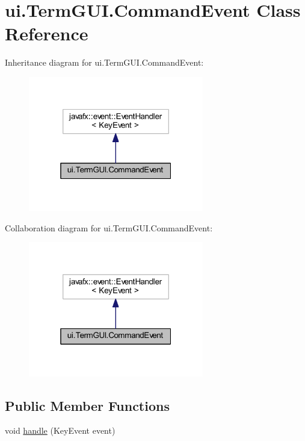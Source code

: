 \hypertarget{classui_1_1_term_g_u_i_1_1_command_event}{}\section{ui.\+Term\+G\+U\+I.\+Command\+Event Class Reference}
\label{classui_1_1_term_g_u_i_1_1_command_event}


Inheritance diagram for ui.\+Term\+G\+U\+I.\+Command\+Event\+:
\nopagebreak
\begin{figure}[H]
\begin{center}
\leavevmode
\includegraphics[width=217pt]{classui_1_1_term_g_u_i_1_1_command_event__inherit__graph}
\end{center}
\end{figure}


Collaboration diagram for ui.\+Term\+G\+U\+I.\+Command\+Event\+:
\nopagebreak
\begin{figure}[H]
\begin{center}
\leavevmode
\includegraphics[width=217pt]{classui_1_1_term_g_u_i_1_1_command_event__coll__graph}
\end{center}
\end{figure}
\subsection*{Public Member Functions}
\begin{DoxyCompactItemize}
\item 
void \mbox{\hyperlink{classui_1_1_term_g_u_i_1_1_command_event_a318fdfbc0c417b4a990a34b275e3896e}{handle}} (Key\+Event event)
\end{DoxyCompactItemize}
